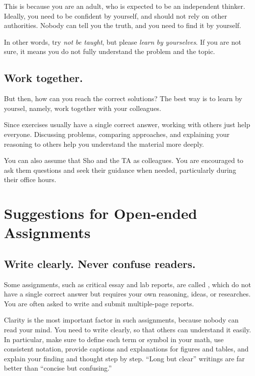 \documentclass[11pt,pdfa,lastpage,minititle]{MishoNote}
\begin{document}
This is because you are an adult, who is expected to be an independent thinker.
Ideally, you need to be confident by yourself, and should not rely on other authorities.
Nobody can tell you the truth, and you need to find it by yourself.

In other words, try \emph{not be taught}, but please \emph{learn by yourselves}.
If you are not sure, it means you do not fully understand the problem and the topic.

\OutputNote

\subsection{Work together.}
But then, how can you reach the correct solutions?
The best way is to learn by yoursel, namely, work together with your colleagues.

Since exercises usually have a single correct answer, working with others just help everyone.
Discussing problems, comparing approaches, and explaining your reasoning to others help you understand the material more deeply.

You can also assume that Sho and the TA as colleagues.
You are encouraged to ask them questions and seek their guidance when needed, particularly during their office hours.


\section*{Suggestions for Open-ended Assignments}
\subsection{Write clearly. Never confuse readers.}
Some assignments, such as critical essay and lab reports, are called , which do not have a single correct answer but requires your own reasoning, ideas, or researches.
You are often asked to write and submit multiple-page reports.

Clarity is the most important factor in such assignments, because nobody can read your mind.
You need to write clearly, so that others can understand it easily.
In particular, make sure to define each term or symbol in your math, use consistent notation, provide captions and explanations for figures and tables, and explain your finding and thought step by step. ``Long but clear'' writings are far better than ``concise but confusing.''
\end{document}
